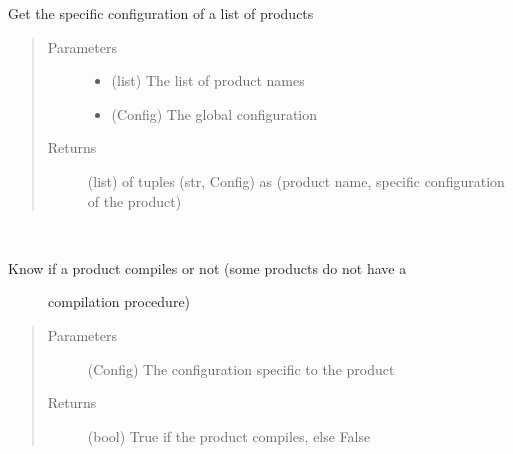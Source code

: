 \documentclass[a4paper,10pt,english]{sphinxmanual}
\begin{document}
\begin{fulllineitems}
\label{\detokenize{apidoc_src/src:src.product.get_products_infos}}
Get the specific configuration of a list of products
\begin{quote}\begin{description}
\item[{Parameters}] \leavevmode\begin{itemize}
\item {} 
 \textendash{} (list) The list of product names

\item {} 
 \textendash{} (Config) The global configuration

\end{itemize}

\item[{Returns}] \leavevmode
(list) of tuples (str, Config)
as (product name, specific configuration of the product)

\end{description}\end{quote}

\end{fulllineitems}


\begin{fulllineitems}
\label{\detokenize{apidoc_src/src:src.product.product_compiles}}~\begin{description}
\item[{Know if a product compiles or not (some products do not have a }] \leavevmode
compilation procedure)

\end{description}
\begin{quote}\begin{description}
\item[{Parameters}] \leavevmode
{} \textendash{} (Config)
The configuration specific to the product

\item[{Returns}] \leavevmode
(bool) 
True if the product compiles, else False

\end{description}\end{quote}

\end{fulllineitems}
\end{document}
